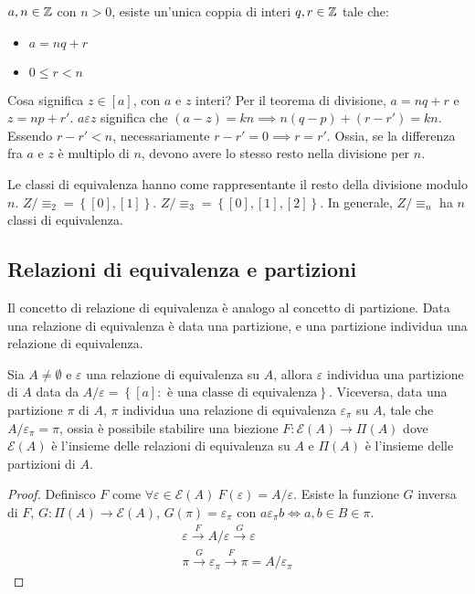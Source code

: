 \begin{theorem}
$a, n \in \mathbb{Z}$ con $n > 0$, esiste un'unica coppia di interi $q, r \in \mathbb{Z}$ tale che:
\begin{itemize}
  \item $a = n q + r$
  \item $0 \le r < n$
\end{itemize}
\end{theorem}
Cosa significa $z \in [a]$, con $a$ e $z$ interi? Per il teorema di divisione, $a = n q + r$ e $z = n p + r'$. $a \varepsilon z $ significa che $ (a - z) = k n \implies n (q - p) + (r - r') = kn $. Essendo $r - r' < n$, necessariamente $r - r' = 0 \implies r = r'$. Ossia, se la differenza fra $a$ e $z$ \`e multiplo di $n$, devono avere lo stesso resto nella divisione per $n$.

Le classi di equivalenza hanno come rappresentante il resto della divisione modulo $n$. $Z / \equiv_{2} = \left \{ [0], [1] \right \}$. $Z / \equiv_{3} = \left \{ [0], [1], [2] \right \}$. In generale, $Z / \equiv_{n}$ ha $n$ classi di equivalenza.

\subsection{Relazioni di equivalenza e partizioni}

Il concetto di relazione di equivalenza \`e analogo al concetto di partizione. Data una relazione di equivalenza \`e data una partizione, e una partizione individua una relazione di equivalenza.

\begin{prop}
Sia $A \neq \emptyset$ e $\varepsilon$ una relazione di equivalenza su $A$, allora $\varepsilon$ individua una partizione di $A$ data da $A / \varepsilon = \left \{ [a] :  \text{ \`e una classe di equivalenza}  \right \}$. Viceversa, data una partizione $\pi$ di $A$, $\pi$ individua una relazione di equivalenza $\varepsilon_{\pi}$ su $A$, tale che $A / \varepsilon_{\pi} = \pi$, ossia \`e possibile stabilire una biezione $F: \mathcal{E}(A) \to \Pi(A)$ dove $\mathcal{E}(A)$ \`e l'insieme delle relazioni di equivalenza su $A$ e $\Pi(A)$ \`e l'insieme delle partizioni di $A$.
\end{prop}
\begin{proof}
Definisco $F$ come $\forall \varepsilon \in \mathcal{E}(A) \ F(\varepsilon) = A / \varepsilon$. Esiste la funzione $G$ inversa di $F$, $G : \Pi(A) \to \mathcal{E}(A)$, $G(\pi) = \varepsilon_{\pi}$ con $a \varepsilon_{\pi} b \iff a,b \in B \in \pi$.
\begin{gather*}
\varepsilon \xrightarrow{F} A / \varepsilon \xrightarrow{G} \varepsilon \\
\pi \xrightarrow{G} \varepsilon_{\pi} \xrightarrow{F} \pi = A / \varepsilon_{\pi} 
\end{gather*}
\end{proof}


